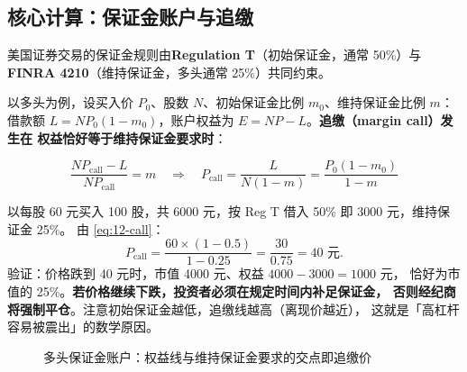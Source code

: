 \subsection{核心计算：保证金账户与追缴}

美国证券交易的保证金规则由\textbf{Regulation T}（初始保证金，通常 50\%）与
\textbf{FINRA 4210}（维持保证金，多头通常 25\%）共同约束。

以多头为例，设买入价 $P_0$、股数 $N$、初始保证金比例 $m_0$、维持保证金比例 $m$：
借款额 $L = N P_0(1-m_0)$，账户权益为 $E = NP - L$。\textbf{追缴（margin call）发生在
权益恰好等于维持保证金要求时}：

\begin{equation}
  \frac{NP_{\text{call}}-L}{NP_{\text{call}}} = m
  \quad\Longrightarrow\quad
  P_{\text{call}} = \frac{L}{N(1-m)} = \frac{P_0(1-m_0)}{1-m}
  \label{eq:12-call}
\end{equation}

\begin{example}[多头保证金追缴价的计算]\label{ex:12-longcall}
以每股 60 元买入 100 股，共 6000 元，按 Reg T 借入 50\% 即 3000 元，维持保证金 25\%。
由 \cref{eq:12-call}：
\[
  P_{\text{call}} = \frac{60\times(1-0.5)}{1-0.25} = \frac{30}{0.75} = 40 \text{ 元}.
\]
验证：价格跌到 40 元时，市值 4000 元、权益 $4000-3000 = 1000$ 元，
恰好为市值的 25\%。\textbf{若价格继续下跌，投资者必须在规定时间内补足保证金，
否则经纪商将强制平仓}。注意初始保证金越低，追缴线越高（离现价越近），
这就是「高杠杆容易被震出」的数学原因。
\end{example}

\begin{figure}[htbp]
\centering
{}
\caption{多头保证金账户：权益线与维持保证金要求的交点即追缴价}\label{fig:12-margin}
\end{figure}

